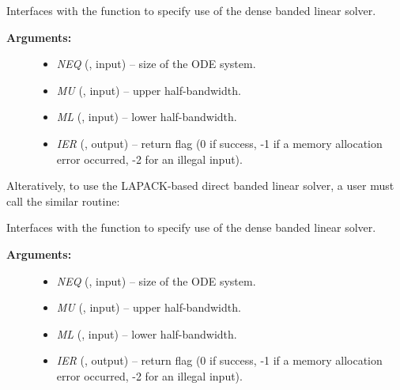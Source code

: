 \documentclass[letterpaper,10pt,english]{sphinxmanual}
\begin{document}
\begin{fulllineitems}
\label{f_interface/Usage:f/_/FARKBAND}
Interfaces with the {\hyperref[c_interface/User_callable:ARKBand]{}} function to
specify use of the dense banded linear solver.
\begin{description}
\item[{\textbf{Arguments:}}] \leavevmode\begin{itemize}
\item {} 
\emph{NEQ} (, input) -- size of the ODE system.

\item {} 
\emph{MU} (, input) -- upper half-bandwidth.

\item {} 
\emph{ML} (, input) -- lower half-bandwidth.

\item {} 
\emph{IER} (, output) -- return flag (0 if success, -1 if a memory allocation
error occurred, -2 for an illegal input).

\end{itemize}

\end{description}

\end{fulllineitems}


Alteratively, to use the LAPACK-based direct banded linear solver, a
user must call the similar {\hyperref[f_interface/Usage:f/_/FARKLAPACKBAND]{}} routine:

\begin{fulllineitems}
\label{f_interface/Usage:f/_/FARKLAPACKBAND}
Interfaces with the {\hyperref[c_interface/User_callable:ARKLapackBand]{}} function
to specify use of the dense banded linear solver.
\begin{description}
\item[{\textbf{Arguments:}}] \leavevmode\begin{itemize}
\item {} 
\emph{NEQ} (, input) -- size of the ODE system.

\item {} 
\emph{MU} (, input) -- upper half-bandwidth.

\item {} 
\emph{ML} (, input) -- lower half-bandwidth.

\item {} 
\emph{IER} (, output) -- return flag (0 if success, -1 if a memory allocation
error occurred, -2 for an illegal input).

\end{itemize}

\end{description}

\end{fulllineitems}
\end{document}

